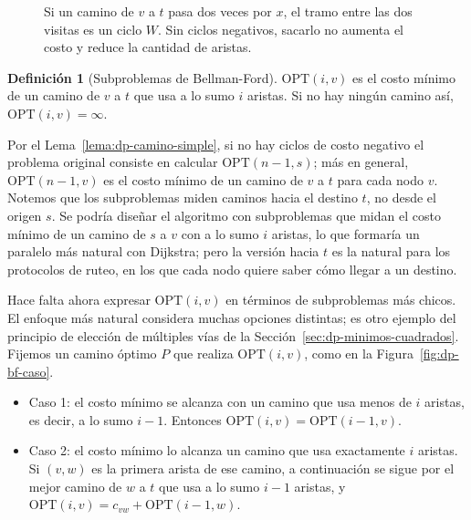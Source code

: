 \documentclass[12pt, spanish, oneside, openany]{book}
\theoremstyle{uprightplain}
\theoremstyle{definition}
\newtheorem{definicion}[teorema]{Definición}
\theoremstyle{remark}
\theoremstyle{definition}
\newcommand{\OPT}{\mathrm{OPT}} %
\begin{document}
\begin{figure}[H]
\centering
{}
\caption{Si un camino de $v$ a $t$ pasa dos veces por $x$, el tramo entre las
dos visitas es un ciclo $W$. Sin ciclos negativos, sacarlo no aumenta el costo
y reduce la cantidad de aristas.}
\label{fig:dp-ciclo-removible}
\end{figure}

\begin{definicion}[Subproblemas de Bellman-Ford]
\label{def:dp-opt-bf}
$\OPT(i,v)$ es el costo mínimo de un camino de $v$ a $t$ que usa a lo sumo $i$ aristas. Si no hay ningún camino así, $\OPT(i,v)=\infty$.
\end{definicion}

Por el Lema~\ref{lema:dp-camino-simple}, si no hay ciclos de costo negativo el problema original consiste en calcular $\OPT(n-1,s)$; más en general, $\OPT(n-1,v)$ es el costo mínimo de un camino de $v$ a $t$ para cada nodo $v$. Notemos que los subproblemas miden caminos hacia el destino $t$, no desde el origen $s$. Se podría diseñar el algoritmo con subproblemas que midan el costo mínimo de un camino de $s$ a $v$ con a lo sumo $i$ aristas, lo que formaría un paralelo más natural con Dijkstra; pero la versión hacia $t$ es la natural para los protocolos de ruteo, en los que cada nodo quiere saber cómo llegar a un destino.

Hace falta ahora expresar $\OPT(i,v)$ en términos de subproblemas más chicos. El enfoque más natural considera muchas opciones distintas; es otro ejemplo del principio de elección de múltiples vías de la Sección~\ref{sec:dp-minimos-cuadrados}. Fijemos un camino óptimo $P$ que realiza $\OPT(i,v)$, como en la Figura~\ref{fig:dp-bf-caso}.
\begin{itemize}
    \item Caso 1: el costo mínimo se alcanza con un camino que usa menos de $i$ aristas, es decir, a lo sumo $i-1$. Entonces $\OPT(i,v)=\OPT(i-1,v)$.
    \item Caso 2: el costo mínimo lo alcanza un camino que usa exactamente $i$ aristas. Si $(v,w)$ es la primera arista de ese camino, a continuación se sigue por el mejor camino de $w$ a $t$ que usa a lo sumo $i-1$ aristas, y $\OPT(i,v)=c_{vw}+\OPT(i-1,w)$.
\end{itemize}
\end{document}
